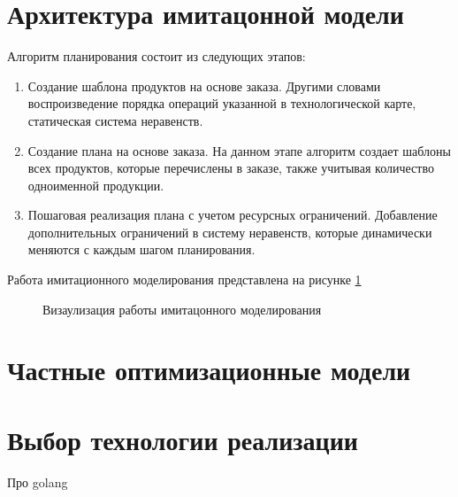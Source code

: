 \section{Архитектура имитацонной модели}

Алгоритм планирования состоит из следующих этапов:
\begin{enumerate}
    \item Создание шаблона продуктов на основе заказа. Другими словами воспроизведение порядка операций указанной в технологической карте, статическая система неравенств.
    \item Создание плана на основе заказа. На данном этапе алгоритм создает шаблоны всех продуктов, которые перечислены в заказе, также учитывая количество одноименной продукции.
    \item Пошаговая реализация плана с учетом ресурсных ограничений. Добавление дополнительных ограничений в систему неравенств, которые динамически меняются с каждым шагом планирования.
\end{enumerate}
Работа имитационного моделирования представлена на рисунке \ref{ris:alg}
\begin{figure}[H]
    \caption{Визаулизация работы имитацонного моделирования}
    \label{ris:alg}
\end{figure}

\section{Частные оптимизационные модели}

\section{Выбор технологии реализации}

Про golang